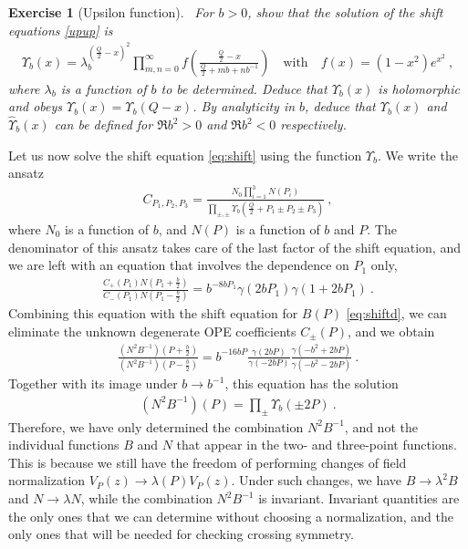 \documentclass[12pt, a4paper]{article}
\theoremstyle{break}
\newtheorem{exo}{Exercise}[section]
\begin{document}
\begin{exo}[Upsilon function]
~\label{exo:upsilon}
 For $b>0$, show that the solution of the shift equations \eqref{upup} is 
 \begin{align}
 \Upsilon_b(x) = \lambda_b^{(\frac{Q}{2}-x)^2}\prod_{m,n=0}^\infty f\left(\frac{\frac{Q}{2}-x}{\frac{Q}{2}+mb+nb^{-1}}\right) \quad \text{with} \quad f(x)=(1-x^2)e^{x^2}\ ,
 \label{eq:up}
\end{align}
 where $\lambda_b$ is a function of $b$ to be determined. Deduce that $\Upsilon_b(x)$ is holomorphic and obeys $\Upsilon_b(x)=\Upsilon_b(Q-x)$. By analyticity in $b$, deduce that $\Upsilon_b(x)$ and $\hat\Upsilon_b(x)$ can be defined for $\Re b^2>0$ and $\Re b^2<0$ respectively.
\end{exo}
Let us now solve the shift equation \eqref{eq:shift} using the function $\Upsilon_b$. We write the ansatz
\begin{align}
 C_{P_1,P_2,P_3} =  \frac{N_0 \prod_{i=1}^3 N(P_i)}{\prod_{\pm,\pm} \Upsilon_b\left(\tfrac{Q}{2}+P_1\pm P_2 \pm P_3\right)} \ ,
 \label{cppp}
\end{align}
where $N_0$ is a function of $b$, and $N(P)$ is a function of $b$ and $P$. 
The denominator of this ansatz takes care of the last factor of the shift equation, and we are left with an equation that involves the dependence on $P_1$ only, 
\begin{align}
 \frac{C_+(P_1) N(P_1+\frac{b}{2})}{C_-(P_1) N(P_1-\frac{b}{2}) } 
 =b^{-8bP_1}\gamma(2bP_1) \gamma(1+2bP_1) \ .
\end{align}
Combining this equation with the shift equation for $B(P)$ \eqref{eq:shiftd}, we can eliminate the unknown degenerate OPE coefficients $C_\pm(P)$, and we obtain
\begin{align}
 \frac{\left(N^2B^{-1}\right)(P+\frac{b}{2})}{\left(N^2B^{-1}\right)(P-\frac{b}{2})} = b^{-16bP} \frac{\gamma(2bP)}{\gamma(-2bP)} \frac{\gamma(-b^2+2bP)}{\gamma(-b^2-2bP)}\ .
 \label{nbs}
\end{align}
Together with its image under $b\to b^{-1}$, this equation has the solution
\begin{align}
 \left(N^2B^{-1}\right)(P) = \prod_\pm \Upsilon_b(\pm 2P)\ .
 \label{eq:ntbm}
\end{align}
Therefore, we have only determined the combination $N^2B^{-1}$, and not the individual functions $B$ and $N$ that appear in the two- and three-point functions. This is because we still have the freedom of performing changes of field normalization $V_P(z) \to \lambda(P)V_P(z)$. Under such changes, we have $B\to \lambda^2B$ and $N\to \lambda N$, while
the combination $N^2B^{-1}$ is invariant. Invariant quantities are the only ones that we can determine without choosing a normalization, and the only ones that will be needed for checking crossing symmetry. 
\end{document}
